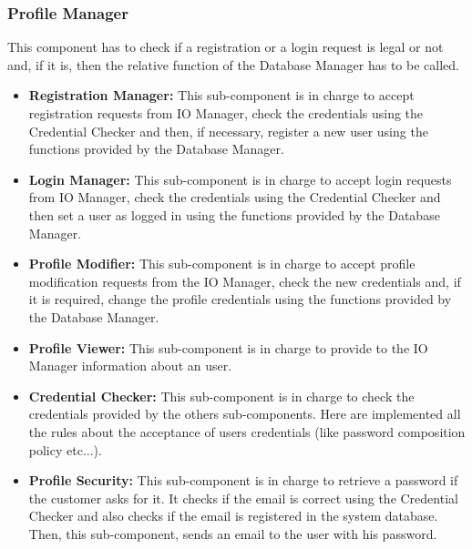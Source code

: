 \documentclass[../../../../../../../dd.tex]{subfiles}
\begin{document}
	\subsubsection{Profile Manager}
		This component has to check if a registration or a login request is legal or not and, if it is, then the relative function of the Database Manager has to be called.
		\begin{itemize}
			\item \textbf{Registration Manager:} This sub-component is in charge to accept registration requests from IO Manager, check the credentials using the Credential Checker and then, if necessary, register a new user using the functions provided by the Database Manager.

			\item \textbf{Login Manager:} This sub-component is in charge to accept login requests from IO Manager, check the credentials using the Credential Checker and then set a user as logged in using the functions provided by the Database Manager.

			\item \textbf{Profile Modifier:} This sub-component is in charge to accept profile modification requests from the IO Manager, check the new credentials and, if it is required, change the profile credentials using the functions provided by the Database Manager.

			\item \textbf{Profile Viewer:} This sub-component is in charge to provide to the IO Manager information about an user.

			\item \textbf{Credential Checker:} This sub-component is in charge to check the credentials provided by the others sub-components. Here are implemented all the rules about the acceptance of users credentials (like password composition policy etc...).

			\item \textbf{Profile Security:} This sub-component is in charge to retrieve a password if the customer asks for it. It checks if the email is correct using the Credential Checker and also checks if the email is registered in the system database. Then, this sub-component, sends an email to the user with his password.
		
		\end{itemize}
\end{document}
